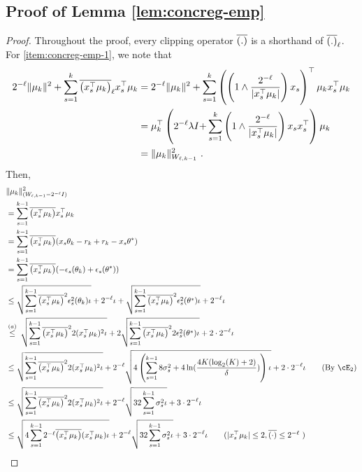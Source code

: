 \subsection{Proof of Lemma \ref{lem:concreg-emp}}
\def\const{\mathsf{const}}
\begin{proof}
  Throughout the proof, every clipping operator $\clip{.}$ is a shorthand of $\clip{.}_\ell$. 
  For \ref{item:concreg-emp-1}, we note that
    \begin{align*}
    2^{-\ell}  \|\mu_k\|^{2} + \sum_{s=1}^{k} \clip{x_s^\top\mu_k}_\ell x_s^\top\mu_k 
    &= 2^{-\ell}  \|\mu_k\|^{2} + \sum_{s=1}^{k} \del{\del{1\wedge \fr{2^{-\ell}}{|x_s^\T\mu_k| } } x_s}^\top\mu_k x_s^\top\mu_k 
    \\&= \mu_k^\top\del{2^{-\ell}\lam I {+} \sum_{s=1}^{k} \del{1\wedge \fr{2^{-\ell}}{|x_s^\T\mu_k| } } x_s x_s^\top }\mu_k 
    \\&= \|\mu_k\|^2_{W_{\ell,k-1}}~.
  \end{align*} 
  Then,
  \begin{align*}
    &\|\mu_k\|_{(W_{\ell,k-1} - 2^{-\ell}  I )}^2 
    \\&= \sum_{s=1}^{k-1} \clip{x_s^\T\mu_k} x_s^\T\mu_k 
    \\&= \sum_{s=1}^{k-1} \clip{x_s^\T\mu_k} (x_s\th_k - r_k + r_k - x_s\th^*) 
    \\&= \sum_{s=1}^{k-1} \clip{x_s^\T\mu_k} (-\eps_s(\th_k) + \eps_s(\th^*)) 
    \\&\le  \sqrt{\sum_{s=1}^{k-1} \clip{x_s^\T\mu_k}^2 \eps^2_s(\th_k) \iota}  + 2^{-\ell} \iota + \sqrt{\sum_{s=1}^{k-1} \clip{x_s^\T\mu_k}^2 \eps_s^2(\th^*) \iota} + 2^{-\ell} \iota  
    \\&\sr{(a)}{\le} \sqrt{\sum_{s=1}^{k-1} \clip{x_s^\T\mu_k}^2 2(x_s^\T\mu_k)^2 \iota}  + 2 \sqrt{\sum_{s=1}^{k-1} \clip{x_s^\T\mu_k}^2 2\eps_s^2(\th^*) \iota} + 2 \cd 2^{-\ell} \iota
    \\&\le \sqrt{\sum_{s=1}^{k-1} \clip{x_s^\T\mu_k}^2 2(x_s^\T\mu_k)^2 \iota}  + 2^{-\ell}\sqrt{4\del{ \sum_{s=1}^{k-1} 8\sig_s^2 + 4 \ln(\fr{4 K (\log_2(K) + 2)}{\dt}) } \iota} + 2\cd2^{-\ell} \iota
        \tag{By $\cE_2$}
    \\&\le \sqrt{\sum_{s=1}^{k-1} \clip{x_s^\T\mu_k}^2 2(x_s^\T\mu_k)^2 \iota}  +  2^{-\ell}\sqrt{32 \sum_{s=1}^{k-1} \sig_s^2 \iota } + 3\cd 2^{-\ell} \iota 
    \\&\le \sqrt{4\sum_{s=1}^{k-1} 2^{-\ell} \clip{x_s^\T\mu_k} (x_s^\T\mu_k) \iota}  + 2^{-\ell}\sqrt{ 32 \sum_{s=1}^{k-1} \sig_s^2 \iota } + 3\cd 2^{-\ell} \iota          \tag{$|x_s^\T\mu_k |\le 2, \clip{\cd} \le 2^{-\ell}$  }

\end{align*}
\end{proof}
